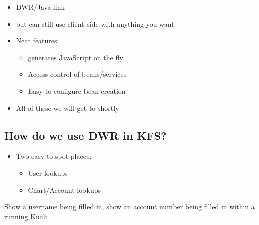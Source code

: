 \begin{ifhtml}
\begin{s5slide}
        \begin{s5notes}
            \begin{itemize}
                \item DWR/Java link   
                \item but can still use client-side with anything you want
            \end{itemize}
            \begin{itemize}
                \item Neat features:
                \begin{itemize}
                    \item generates JavaScript on the fly
                    \item Access control of beans/services
                    \item Easy to configure bean creation
                \end{itemize}
                \item All of these we will get to shortly
            \end{itemize}
        \end{s5notes}
    \end{s5slide}
    \begin{s5slide}
        \section{How do we use DWR in KFS?}
            \begin{itemize}
                \item Two easy to spot places:
                \begin{itemize}
                    \item User lookups
                    \item Chart/Account lookups
                \end{itemize}
            \end{itemize}
        \begin{s5notes}
            Show a username being filled in, show an account number being filled in within a running Kuali
        \end{s5notes}
    \end{s5slide}
    \begin{s5slide}

\end{s5slide}
\end{ifhtml}
